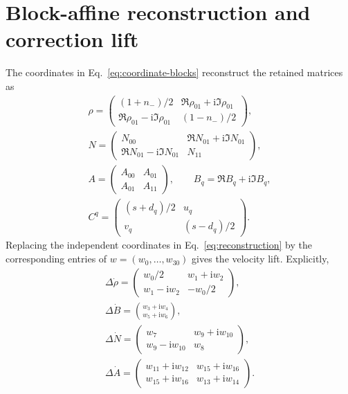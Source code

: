 \documentclass[10pt,twocolumn]{article}
\newcommand{\ii}{\mathrm i}
\begin{document}
\clearpage
\raggedbottom

\section{Block-affine reconstruction and correction lift}
\label{app:block-affine}

The coordinates in Eq.~\eqref{eq:coordinate-blocks} reconstruct the retained
matrices as
\begin{equation}
\begin{gathered}
\rho=\begin{pmatrix}
(1+n_-)/2&\Re\rho_{01}+\ii\Im\rho_{01}\\
\Re\rho_{01}-\ii\Im\rho_{01}&(1-n_-)/2
\end{pmatrix},\\
N=\begin{pmatrix}N_{00}&\Re N_{01}+\ii\Im N_{01}\\
\Re N_{01}-\ii\Im N_{01}&N_{11}\end{pmatrix},\\
A=\begin{pmatrix}A_{00}&A_{01}\\A_{01}&A_{11}\end{pmatrix},\qquad
B_q=\Re B_q+\ii\Im B_q,\\
C^q=\begin{pmatrix}(s+d_q)/2&u_q\\v_q&(s-d_q)/2\end{pmatrix}.
\end{gathered}
\label{eq:reconstruction}
\end{equation}
Replacing the independent coordinates in Eq.~\eqref{eq:reconstruction} by
the corresponding entries of $w=(w_0,\ldots,w_{30})$ gives the velocity
lift.  Explicitly,
\begin{equation}
\begin{gathered}
\Delta\dot\rho=\begin{pmatrix}w_0/2&w_1+\ii w_2\\w_1-\ii w_2&-w_0/2\end{pmatrix},\\
\Delta\dot B=\binom{w_3+\ii w_4}{w_5+\ii w_6},\\
\Delta\dot N=\begin{pmatrix}w_7&w_9+\ii w_{10}\\w_9-\ii w_{10}&w_8\end{pmatrix},\\
\Delta\dot A=\begin{pmatrix}
w_{11}+\ii w_{12}&w_{15}+\ii w_{16}\\
w_{15}+\ii w_{16}&w_{13}+\ii w_{14}
\end{pmatrix}.
\end{gathered}
\label{eq:lift-rho-bna}
\end{equation}
\end{document}
